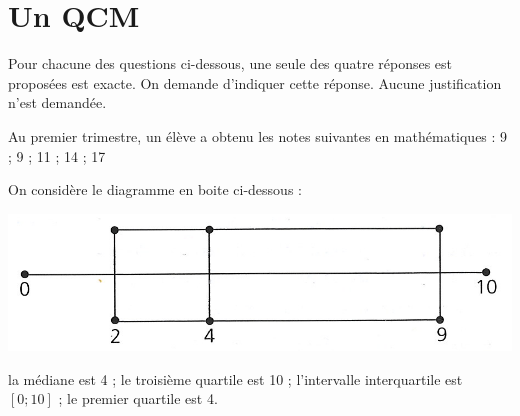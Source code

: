 \section{Un QCM}

Pour chacune des questions ci-dessous, une seule des quatre réponses est proposées est exacte. On demande d'indiquer cette réponse. Aucune justification n'est demandée.

\begin{questions}
	\question[] Au premier trimestre, un élève a obtenu les notes suivantes en mathématiques : 9 ; 9 ; 11 ; 14 ; 17
	


	\question[] On considère le diagramme en boite ci-dessous :
	
	\begin{center}
		\includegraphics[scale=1]{moustache}
	\end{center}
	
	\begin{checkboxes}
		\correctchoice la médiane est 4 ;
		\choice le troisième quartile est 10 ;
		\choice l'intervalle interquartile est $[0; 10]$ ;
		\choice le premier quartile est 4.
	\end{checkboxes}
	
\end{questions}